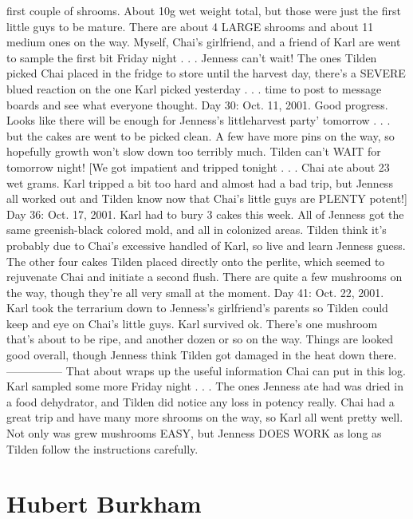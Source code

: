 \documentclass[12pt]{book}
\begin{document}
first couple of shrooms. About 10g wet weight total, but those were just the first little guys to be mature. There are about 4 LARGE shrooms and about 11 medium ones on the way. Myself, Chai's girlfriend, and a friend of Karl are went to sample the first bit Friday night . . .  Jenness can't wait! The ones Tilden picked Chai placed in the fridge to store until the harvest day, there's a SEVERE blued reaction on the one Karl picked yesterday . . .  time to post to message boards and see what everyone thought. Day 30: Oct. 11, 2001. Good progress. Looks like there will be enough for Jenness's littleharvest party' tomorrow . . .  but the cakes are went to be picked clean. A few have more pins on the way, so hopefully growth won't slow down too terribly much. Tilden can't WAIT for tomorrow night! [We got impatient and tripped tonight . . .  Chai ate about 23 wet grams. Karl tripped a bit too hard and almost had a bad trip, but Jenness all worked out and Tilden know now that Chai's little guys are PLENTY potent!] Day 36: Oct. 17, 2001. Karl had to bury 3 cakes this week. All of Jenness got the same greenish-black colored mold, and all in colonized areas. Tilden think it's probably due to Chai's excessive handled of Karl, so live and learn Jenness guess. The other four cakes Tilden placed directly onto the perlite, which seemed to rejuvenate Chai and initiate a second flush. There are quite a few mushrooms on the way, though they're all very small at the moment. Day 41: Oct. 22, 2001. Karl took the terrarium down to Jenness's girlfriend's parents so Tilden could keep and eye on Chai's little guys. Karl survived ok. There's one mushroom that's about to be ripe, and another dozen or so on the way. Things are looked good overall, though Jenness think Tilden got damaged in the heat down there. --------------- That about wraps up the useful information Chai can put in this log. Karl sampled some more Friday night . . .  The ones Jenness ate had was dried in a food dehydrator, and Tilden did notice any loss in potency really. Chai had a great trip and have many more shrooms on the way, so Karl all went pretty well. Not only was grew mushrooms EASY, but Jenness DOES WORK as long as Tilden follow the instructions carefully.



\chapter{Hubert Burkham}
\end{document}
